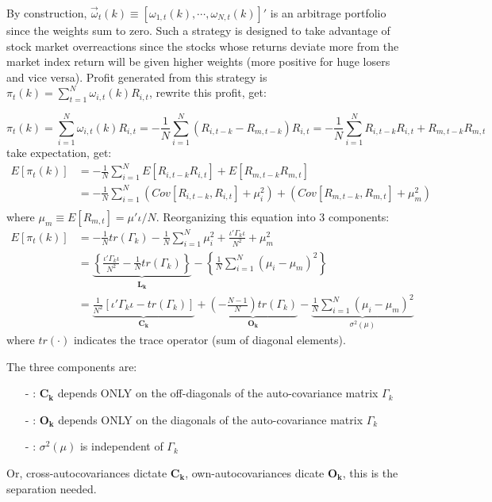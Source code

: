 By construction, $\vec{\omega}_{t}(k)\equiv \left[\omega_{1,t}(k),\cdots,\omega_{N,t}(k)\right]'$ is an arbitrage portfolio 
since the weights sum to zero. Such a strategy is designed to take advantage of stock market overreactions since the stocks
whose returns deviate more from the market index return will be given higher weights (more positive for huge losers and 
vice versa). Profit generated from this strategy is $\pi_t(k)=\sum^N_{t=1}\omega_{i,t}(k)R_{i,t}$, rewrite this profit, get:

$$
\pi_t(k)= \sum^N_{i=1}\omega_{i,t}(k)R_{i,t}= -\frac{1}{N}\sum^N_{i=1}\left(R_{i,t-k}-R_{m,t-k}\right)R_{i,t} = -\frac{1}{N}\sum^N_{i=1}R_{i,t-k}R_{i,t}+R_{m,t-k}R_{m,t}
$$
take expectation, get:
\begin{align*}
    E[\pi_t(k)] &= -\frac{1}{N}\sum^N_{i=1} E\left[R_{i,t-k}R_{i,t}\right]+E\left[R_{m,t-k}R_{m,t}\right]\\
    &= -\frac{1}{N}\sum^N_{i=1}\left(Cov\left[R_{i,t-k},R_{i,t}\right] +\mu_i^2 \right) + \left(Cov\left[R_{m,t-k},R_{m,t}\right] +\mu_m^2 \right)\\
\end{align*}
where $\mu_m\equiv E\left[R_{m,t}\right]=\mu'\iota/N$. Reorganizing this equation into 3 components:
\begin{align*}
    E[\pi_t(k)] &= -\frac{1}{N}tr(\Gamma_k) -\frac{1}{N}\sum^N_{i=1}\mu_i^2+\frac{\iota'\Gamma_k\iota}{N^2}+\mu_m^2\\
    & = \underbrace{\left\{\frac{\iota'\Gamma_k\iota}{N^2} -\frac{1}{N} tr(\Gamma_k) \right\}}_{\mathbf{L_k}}- \left\{\frac{1}{N}\sum^N_{i=1}(\mu_i-\mu_m)^2\right\}\\
    & = \underbrace{\frac{1}{N^2}\left[\iota'\Gamma_k\iota-tr(\Gamma_k)\right]}_{\mathbf{C_k}} + \underbrace{\left(-\frac{N-1}{N}\right)tr(\Gamma_k)}_{\mathbf{O_k}} - \underbrace{\frac{1}{N}\sum^N_{i=1}(\mu_i-\mu_m)^2}_{\sigma^2(\mu)}
\end{align*}
where $tr(\cdot)$ indicates the trace operator (sum of diagonal elements).

The three components are:
\begin{enumerate}
    \item[-]: $\mathbf{C_k}$ depends ONLY on the off-diagonals of the auto-covariance matrix $\Gamma_k$
    \item[-]: $\mathbf{O_k}$ depends ONLY on the diagonals of the auto-covariance matrix $\Gamma_k$
    \item[-]: $\sigma^2(\mu)$ is independent of $\Gamma_k$
\end{enumerate}
Or, cross-autocovariances dictate $\mathbf{C_k}$, own-autocovariances dicate $\mathbf{O_k}$, this is the separation needed.

